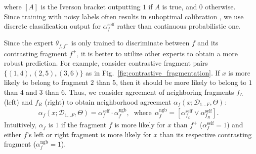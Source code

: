 \documentclass{article}
\theoremstyle{plain}
\theoremstyle{definition}
\theoremstyle{remark}
\begin{document}
where $[A]$ is the Iverson bracket outputting $1$ if $A$ is true, and 0 otherwise.
Since training with noisy labels often results in suboptimal calibration \citep{bae22icml, zong2024dirichlet}, we use discrete classification output for $\alpha^\text{self}_f$ rather than continuous probabilistic one.

Since the expert $\theta_{f, f^+}$ is only trained to discriminate between $f$ and its contrasting fragment $f^+$, it is better to utilize other experts to obtain a more robust prediction.
For example, consider contrastive fragment pairs $\{(1,4), (2,5), (3,6)\}$ as in Fig.~\ref{fig:contrastive_fragmentation}.
If $x$ is more likely to belong to fragment $2$ than $5$, then it should be more likely to belong to $1$ than $4$ and $3$ than $6$.
Thus, we consider agreement of neighboring fragments $f_L$ (left) and $f_R$ (right) to obtain neighborhood agreement $\alpha_f(x; \mathcal{D}_{1 \ldots F}, \Theta)$:
\begin{align}
  \alpha_f(x; \mathcal{D}_{1 \ldots F}, \Theta) = \alpha^\text{self}_f \cdot \alpha^\text{ngb}_f, \hspace{3pt} \text{ where} %
    \ \ \alpha^\text{ngb}_f = \left[ \alpha^\text{self}_{f_L} \lor \alpha^\text{self}_{f_R} \right]. \label{eq:na_final}    
\end{align}
Intuitively, $\alpha_f$ is $1$ if the fragment $f$ is more likely for $x$ than $f^+$ ($\alpha^\text{self}_f = 1$) and either $f$'s left or right fragment is more likely for $x$ than its respective contrasting fragment ($\alpha^\text{ngb}_f = 1$).
\end{document}
